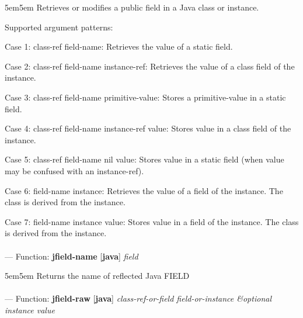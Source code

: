 \begin{adjustwidth}{5em}{5em}
Retrieves or modifies a public field in a Java class or instance.

Supported argument patterns:

   Case 1: class-ref  field-name:
      Retrieves the value of a static field.

   Case 2: class-ref  field-name  instance-ref:
      Retrieves the value of a class field of the instance.

   Case 3: class-ref  field-name  primitive-value:
      Stores a primitive-value in a static field.

   Case 4: class-ref  field-name  instance-ref  value:
      Stores value in a class field of the instance.

   Case 5: class-ref  field-name  nil  value:
      Stores value in a static field (when value may be
      confused with an instance-ref).

   Case 6: field-name  instance:
      Retrieves the value of a field of the instance. The
      class is derived from the instance.

   Case 7: field-name  instance  value:
      Stores value in a field of the instance. The class is
      derived from the instance.


\end{adjustwidth}

\paragraph{}
\label{JAVA:JFIELD-NAME}
--- Function: \textbf{jfield-name} [\textbf{java}] \textit{field}

\begin{adjustwidth}{5em}{5em}
Returns the name of reflected Java FIELD
\end{adjustwidth}

\paragraph{}
\label{JAVA:JFIELD-RAW}
--- Function: \textbf{jfield-raw} [\textbf{java}] \textit{class-ref-or-field field-or-instance \&optional instance value}

